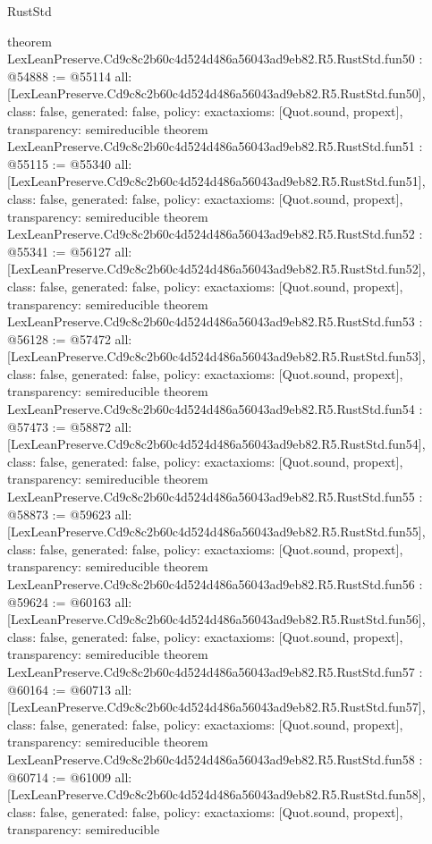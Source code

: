 \begin{lexlean}{RustStd}
\begin{coremodule}
{}
theorem LexLeanPreserve.Cd9c8c2b60c4d524d486a56043ad9eb82.R5.RustStd.fun50 : @54888 := @55114 {
  all: [LexLeanPreserve.Cd9c8c2b60c4d524d486a56043ad9eb82.R5.RustStd.fun50],
  class: false,
  generated: false,
  policy: exact{axioms: [Quot.sound, propext]},
  transparency: semireducible
}
theorem LexLeanPreserve.Cd9c8c2b60c4d524d486a56043ad9eb82.R5.RustStd.fun51 : @55115 := @55340 {
  all: [LexLeanPreserve.Cd9c8c2b60c4d524d486a56043ad9eb82.R5.RustStd.fun51],
  class: false,
  generated: false,
  policy: exact{axioms: [Quot.sound, propext]},
  transparency: semireducible
}
theorem LexLeanPreserve.Cd9c8c2b60c4d524d486a56043ad9eb82.R5.RustStd.fun52 : @55341 := @56127 {
  all: [LexLeanPreserve.Cd9c8c2b60c4d524d486a56043ad9eb82.R5.RustStd.fun52],
  class: false,
  generated: false,
  policy: exact{axioms: [Quot.sound, propext]},
  transparency: semireducible
}
theorem LexLeanPreserve.Cd9c8c2b60c4d524d486a56043ad9eb82.R5.RustStd.fun53 : @56128 := @57472 {
  all: [LexLeanPreserve.Cd9c8c2b60c4d524d486a56043ad9eb82.R5.RustStd.fun53],
  class: false,
  generated: false,
  policy: exact{axioms: [Quot.sound, propext]},
  transparency: semireducible
}
theorem LexLeanPreserve.Cd9c8c2b60c4d524d486a56043ad9eb82.R5.RustStd.fun54 : @57473 := @58872 {
  all: [LexLeanPreserve.Cd9c8c2b60c4d524d486a56043ad9eb82.R5.RustStd.fun54],
  class: false,
  generated: false,
  policy: exact{axioms: [Quot.sound, propext]},
  transparency: semireducible
}
theorem LexLeanPreserve.Cd9c8c2b60c4d524d486a56043ad9eb82.R5.RustStd.fun55 : @58873 := @59623 {
  all: [LexLeanPreserve.Cd9c8c2b60c4d524d486a56043ad9eb82.R5.RustStd.fun55],
  class: false,
  generated: false,
  policy: exact{axioms: [Quot.sound, propext]},
  transparency: semireducible
}
theorem LexLeanPreserve.Cd9c8c2b60c4d524d486a56043ad9eb82.R5.RustStd.fun56 : @59624 := @60163 {
  all: [LexLeanPreserve.Cd9c8c2b60c4d524d486a56043ad9eb82.R5.RustStd.fun56],
  class: false,
  generated: false,
  policy: exact{axioms: [Quot.sound, propext]},
  transparency: semireducible
}
theorem LexLeanPreserve.Cd9c8c2b60c4d524d486a56043ad9eb82.R5.RustStd.fun57 : @60164 := @60713 {
  all: [LexLeanPreserve.Cd9c8c2b60c4d524d486a56043ad9eb82.R5.RustStd.fun57],
  class: false,
  generated: false,
  policy: exact{axioms: [Quot.sound, propext]},
  transparency: semireducible
}
theorem LexLeanPreserve.Cd9c8c2b60c4d524d486a56043ad9eb82.R5.RustStd.fun58 : @60714 := @61009 {
  all: [LexLeanPreserve.Cd9c8c2b60c4d524d486a56043ad9eb82.R5.RustStd.fun58],
  class: false,
  generated: false,
  policy: exact{axioms: [Quot.sound, propext]},
  transparency: semireducible
}
\end{coremodule}
\end{lexlean}
